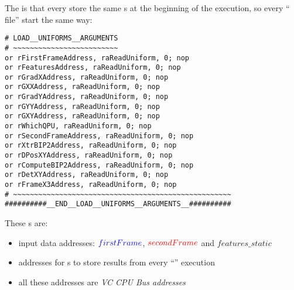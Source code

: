 The  is that every \qpu{} store the same \uni{}s at the beginning of the execution, so every \enquote{ file} start the same way:

\begin{lstlisting}
# LOAD__UNIFORMS__ARGUMENTS
# ~~~~~~~~~~~~~~~~~~~~~~~~~
or rFirstFrameAddress, raReadUniform, 0; nop
or rFeaturesAddress, raReadUniform, 0; nop
or rGradXAddress, raReadUniform, 0; nop
or rGXXAddress, raReadUniform, 0; nop
or rGradYAddress, raReadUniform, 0; nop
or rGYYAddress, raReadUniform, 0; nop
or rGXYAddress, raReadUniform, 0; nop
or rWhichQPU, raReadUniform, 0; nop
or rSecondFrameAddress, raReadUniform, 0; nop
or rXtrBIP2Address, raReadUniform, 0; nop
or rDPosXYAddress, raReadUniform, 0; nop
or rComputeBIP2Address, raReadUniform, 0; nop
or rDetXYAddress, raReadUniform, 0; nop
or rFrameX3Address, raReadUniform, 0; nop
# ~~~~~~~~~~~~~~~~~~~~~~~~~~~~~~~~~~~~~~~~~~~~~~~~~~~~
##########__END__LOAD__UNIFORMS__ARGUMENTS__##########
\end{lstlisting}

These \uni{}s are:
\begin{itemize}
	\item input data addresses: $\textcolor{blue}{firstFrame}$, $\textcolor{red}{secondFrame}$ and $features\_static$
	\item addresses for \qpu{}s to store results from every \enquote{} execution
	\item all these addresses are \emph{VC CPU Bus addresses}
\end{itemize}

